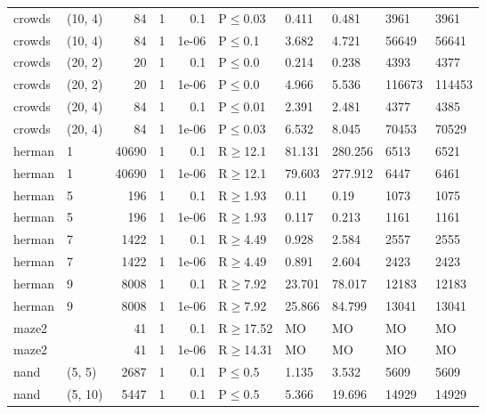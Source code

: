 \begin{longtable}{llrrrlllll}
 crowds        & (10, 4)   &     	84 & 1 & 0.1   & P$\leq$0.03  & 0.411   & 0.481    & 3961   & 3961   \\
 crowds        & (10, 4)   &     	84 & 1 & 1e-06 & P$\leq$0.1   & 3.682   & 4.721    & 56649  & 56641  \\
 crowds        & (20, 2)   &     	20 & 1 & 0.1   & P$\leq$0.0   & 0.214   & 0.238    & 4393   & 4377   \\
 crowds        & (20, 2)   &     	20 & 1 & 1e-06 & P$\leq$0.0   & 4.966   & 5.536    & 116673 & 114453 \\
 crowds        & (20, 4)   &     	84 & 1 & 0.1   & P$\leq$0.01  & 2.391   & 2.481    & 4377   & 4385   \\
 crowds        & (20, 4)   &     	84 & 1 & 1e-06 & P$\leq$0.03  & 6.532   & 8.045    & 70453  & 70529  \\
 herman        & 1         &  	40690 & 1 & 0.1   & R$\geq$12.1  & 81.131  & 280.256  & 6513   & 6521   \\
 herman        & 1         &  	40690 & 1 & 1e-06 & R$\geq$12.1  & 79.603  & 277.912  & 6447   & 6461   \\
 herman        & 5         &    	196 & 1 & 0.1   & R$\geq$1.93  & 0.11    & 0.19     & 1073   & 1075   \\
 herman        & 5         &    	196 & 1 & 1e-06 & R$\geq$1.93  & 0.117   & 0.213    & 1161   & 1161   \\
 herman        & 7         &   	1422 & 1 & 0.1   & R$\geq$4.49  & 0.928   & 2.584    & 2557   & 2555   \\
 herman        & 7         &   	1422 & 1 & 1e-06 & R$\geq$4.49  & 0.891   & 2.604    & 2423   & 2423   \\
 herman        & 9         &   	8008 & 1 & 0.1   & R$\geq$7.92  & 23.701  & 78.017   & 12183  & 12183  \\
 herman        & 9         &   	8008 & 1 & 1e-06 & R$\geq$7.92  & 25.866  & 84.799   & 13041  & 13041  \\
 maze2         &           &     	41 & 1 & 0.1   & R$\geq$17.52 & MO      & MO       & MO     & MO     \\
 maze2         &           &     	41 & 1 & 1e-06 & R$\geq$14.31 & MO      & MO       & MO     & MO     \\
 nand          & (5, 5)    &   	2687 & 1 & 0.1   & P$\leq$0.5   & 1.135   & 3.532    & 5609   & 5609   \\
 nand          & (5, 10)   &   	5447 & 1 & 0.1   & P$\leq$0.5   & 5.366   & 19.696   & 14929  & 14929  \\

\end{longtable}
